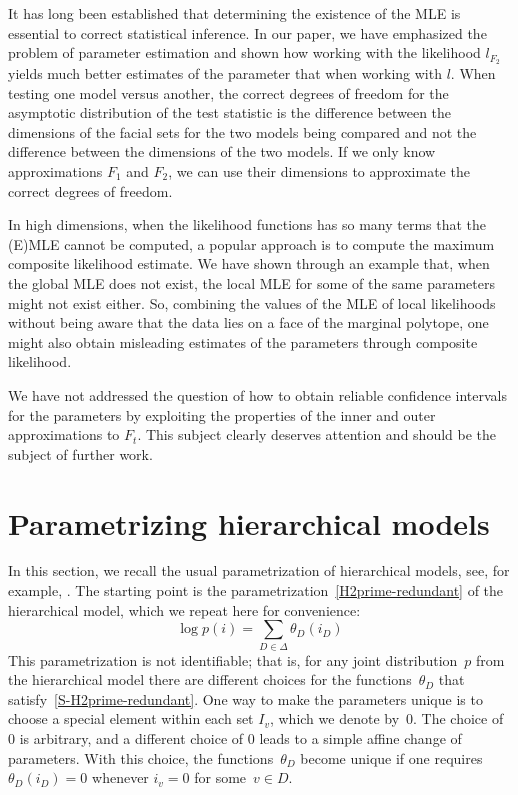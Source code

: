 \documentclass[aos,noinfoline]{imsart}
\theoremstyle{remark}
\theoremstyle{definition}
\begin{document}
It has long been established that determining the existence of the MLE is essential to correct statistical inference. In our paper, we have emphasized the problem of parameter estimation and shown how working with the likelihood $l_{F_2}$ yields much better estimates of the parameter that when working with $l$.
When testing one model versus another, the correct degrees of freedom for the asymptotic distribution of the test statistic is the difference between the dimensions of the facial sets for the two models being compared and not the difference between the dimensions of the two models.
If we only know approximations $F_1$ and $F_2$, we can use their dimensions to approximate the correct  degrees of freedom.  

In high dimensions, when the likelihood functions has so many terms that the (E)MLE cannot be computed,
a popular approach is to compute the maximum composite likelihood estimate. We have shown through an example
that,  when the global MLE does not exist, the local MLE for some of the same parameters might not exist either.  So, combining the values of the MLE of local likelihoods without being aware that the data lies on a face of the marginal polytope, one might also obtain misleading estimates of the parameters through composite likelihood.

We have not addressed the question of how to obtain reliable confidence intervals for the parameters by exploiting the properties of the inner and outer approximations to $F_t$. This subject clearly deserves attention and should be the subject of further work.


\appendix

\renewcommand{\theequation}{\thesection\arabic{equation}}

\section{Parametrizing hierarchical models}
\label{S-sec:notation-hier}

In this section, we recall the usual parametrization of hierarchical models, see, for example,
\cite{LetacMassam12:Bayes_regularization}.  The starting point is the parametrization~\eqref{H2prime-redundant} of the
hierarchical model, which we repeat here for convenience:
\begin{equation}
  \label{S-H2prime-redundant}
  \log p(i)=\sum_{D\in \Delta} \theta_D(i_D)
\end{equation}
This parametrization is not identifiable; that is, for any joint distribution~$p$ from the
hierarchical model there are different choices for the functions~$\theta_{D}$ that satisfy~\eqref{S-H2prime-redundant}.
One way to make the parameters unique is to choose a special element within each set $I_v$, which we denote by~0.  The
choice of 0 is arbitrary, and a different choice of 0 leads to a simple affine change of parameters.  With this choice,
the functions~$\theta_{D}$ become unique if one requires $\theta_{D}(i_{D})=0$ whenever $i_{v}=0$ for some~$v\in D$.
\end{document}
